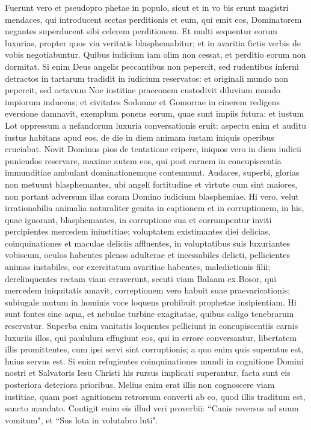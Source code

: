 \begin{biblechapter} 
\verse Fuerunt vero et pseudopro phetae in populo, sicut et in vo bis erunt magistri mendaces, qui introducent sectas perditionis et eum, qui emit eos, Dominatorem negantes superducent sibi celerem perditionem. 
\verse Et multi sequentur eorum luxurias, propter quos via veritatis blasphemabitur; 
\verse et in avaritia fictis verbis de vobis negotiabuntur. Quibus iudicium iam olim non cessat, et perditio eorum non dormitat. 
\verse Si enim Deus angelis peccantibus non pepercit, sed rudentibus inferni detractos in tartarum tradidit in iudicium reservatos: 
\verse et originali mundo non pepercit, sed octavum Noe iustitiae praeconem custodivit diluvium mundo impiorum inducens; 
\verse et civitates Sodomae et Gomorrae in cinerem redigens eversione damnavit, exemplum ponens eorum, quae sunt impiis futura:  
\verse et iustum Lot oppressum a nefandorum luxuria conversationis eruit: 
\verse aspectu enim et auditu iustus habitans apud eos, de die in diem animam iustam iniquis operibus cruciabat. 
\verse Novit Dominus pios de tentatione eripere, iniquos vero in diem iudicii puniendos reservare, 
\verse maxime autem eos, qui post carnem in concupiscentia immunditiae ambulant dominationemque contemnunt. Audaces, superbi, glorias non metuunt blasphemantes, 
\verse ubi angeli fortitudine et virtute cum sint maiores, non portant adversum illas coram Domino iudicium blasphemiae. 
\verse Hi vero, velut irrationabilia animalia naturaliter genita in captionem et in corruptionem, in his, quae ignorant, blasphemantes, in corruptione sua et corrumpentur 
\verse inviti percipientes mercedem iniustitiae; voluptatem existimantes diei delicias, coinquinationes et maculae deliciis affluentes, in voluptatibus suis luxuriantes vobiscum,  
\verse oculos habentes plenos adulterae et incessabiles delicti, pellicientes animas instabiles, cor exercitatum avaritiae habentes, maledictionis filii;  
\verse derelinquentes rectam viam erraverunt, secuti viam Balaam ex Bosor, qui mercedem iniquitatis amavit, 
\verse correptionem vero habuit suae praevaricationis; subiugale mutum in hominis voce loquens prohibuit prophetae insipientiam. 
\verse Hi sunt fontes sine aqua, et nebulae turbine exagitatae, quibus caligo tenebrarum reservatur. 
\verse Superba enim vanitatis loquentes pelliciunt in concupiscentiis carnis luxuriis illos, qui paululum effugiunt eos, qui in errore conversantur, 
\verse libertatem illis promittentes, cum ipsi servi sint corruptionis; a quo enim quis superatus est, huius servus est. 
\verse Si enim refugientes coinquinationes mundi in cognitione Domini nostri et Salvatoris Iesu Christi his rursus implicati superantur, facta sunt eis posteriora deteriora prioribus. 
\verse Melius enim erat illis non cognoscere viam iustitiae, quam post agnitionem retrorsum converti ab eo, quod illis traditum est, sancto mandato. 
\verse Contigit enim eis illud veri proverbii: “Canis reversus ad suum vomitum", et “Sus lota in volutabro luti". 
\end{biblechapter}

